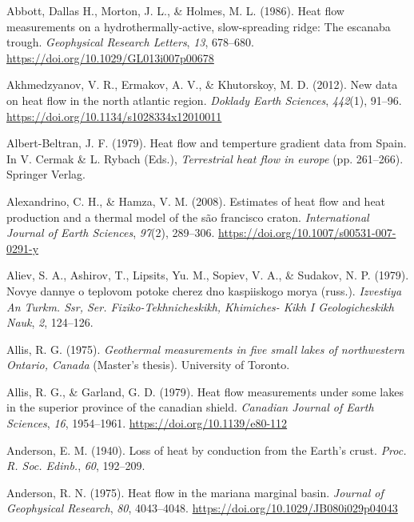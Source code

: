 \documentclass[draft,linenumbers]{agujournal2018}
\begin{document}
\leavevmode{}%
Abbott, Dallas H., Morton, J. L., \& Holmes, M. L. (1986). Heat flow
measurements on a hydrothermally-active, slow-spreading ridge: The
escanaba trough. \emph{Geophysical Research Letters}, \emph{13},
678--680. \url{https://doi.org/10.1029/GL013i007p00678}

\leavevmode{}%
Akhmedzyanov, V. R., Ermakov, A. V., \& Khutorskoy, M. D. (2012). New
data on heat flow in the north atlantic region. \emph{Doklady Earth
Sciences}, \emph{442}(1), 91--96.
\url{https://doi.org/10.1134/s1028334x12010011}

\leavevmode{}%
Albert-Beltran, J. F. (1979). Heat flow and temperture gradient data
from {Spain}. In V. Cermak \& L. Rybach (Eds.), \emph{Terrestrial heat
flow in europe} (pp. 261--266). Springer Verlag.

\leavevmode{}%
Alexandrino, C. H., \& Hamza, V. M. (2008). Estimates of heat flow and
heat production and a thermal model of the são francisco craton.
\emph{International Journal of Earth Sciences}, \emph{97}(2), 289--306.
\url{https://doi.org/10.1007/s00531-007-0291-y}

\leavevmode{}%
Aliev, S. A., Ashirov, T., Lipsits, Yu. M., Sopiev, V. A., \& Sudakov,
N. P. (1979). Novye dannye o teplovom potoke cherez dno kaspiiskogo
morya (russ.). \emph{Izvestiya An Turkm. Ssr, Ser.
Fiziko-Tekhnicheskikh, Khimiches- Kikh I Geologicheskikh Nauk},
\emph{2}, 124--126.

\leavevmode{}%
Allis, R. G. (1975). \emph{Geothermal measurements in five small lakes
of northwestern {Ontario, Canada}} (Master's thesis). University of
Toronto.

\leavevmode{}%
Allis, R. G., \& Garland, G. D. (1979). Heat flow measurements under
some lakes in the superior province of the canadian shield.
\emph{Canadian Journal of Earth Sciences}, \emph{16}, 1954--1961.
\url{https://doi.org/10.1139/e80-112}

\leavevmode{}%
Anderson, E. M. (1940). Loss of heat by conduction from the {Earth's}
crust. \emph{Proc. R. Soc. Edinb.}, \emph{60}, 192--209.

\leavevmode{}%
Anderson, R. N. (1975). Heat flow in the mariana marginal basin.
\emph{Journal of Geophysical Research}, \emph{80}, 4043--4048.
\url{https://doi.org/10.1029/JB080i029p04043}
\end{document}
